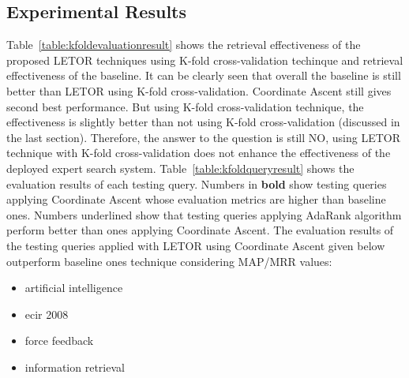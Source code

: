 \subsection{Experimental Results}

Table~\ref{table:kfoldevaluationresult} shows the retrieval effectiveness of the proposed LETOR techniques using K-fold cross-validation techinque
and retrieval effectiveness of the baseline.
It can be clearly seen that overall the baseline is still better than LETOR using K-fold cross-validation. 
Coordinate Ascent still gives second best performance. But using K-fold cross-validation technique, the effectiveness is slightly better than
not using K-fold cross-validation (discussed in the last section). Therefore, the answer
to the question is still NO, using LETOR technique with K-fold cross-validation does not enhance the effectiveness of the deployed expert search system.
Table~\ref{table:kfoldqueryresult} shows the evaluation results of each testing query. Numbers in \textbf{bold} show testing queries applying Coordinate Ascent 
whose evaluation metrics are higher
than baseline ones. Numbers underlined show that testing queries applying AdaRank algorithm perform better than ones applying Coordinate Ascent.
The evaluation results of the testing queries applied with LETOR using Coordinate Ascent given below outperform baseline ones technique considering MAP/MRR values:
\begin{itemize}
 \item artificial intelligence
 \item ecir 2008
 \item force feedback
 \item information retrieval
\end{itemize}


\begin{table}
\centering
{}
\caption{Evaluation Results Using K-fold Cross-validation} \label{table:kfoldevaluationresult}
\end{table}

